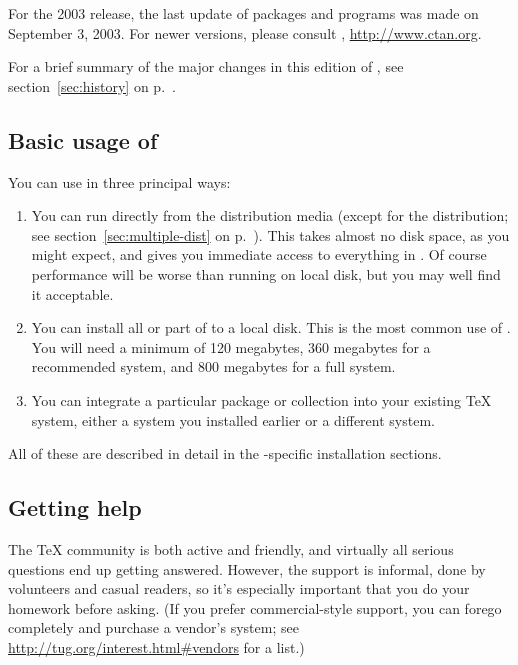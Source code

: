 \documentclass{article}
\begin{document}
For the 2003 release, the last update of packages and programs was made
on September 3, 2003.  For newer versions, please consult ,
\url{http://www.ctan.org}.

For a brief summary of the major changes in this edition of \TeXLive{},
see section~\ref{sec:history} on p.~\pageref{sec:history}.


\subsection{Basic usage of \protect\TeXLive{}}
\label{sec:basic}

You can use \TeXLive{} in three principal ways:

\begin{enumerate}

\item You can run \TeXLive{} directly from the distribution media
(except for the  distribution; see
section~\ref{sec:multiple-dist} on p.~\pageref{sec:multiple-dist}).
This takes almost no disk space, as you might expect, and gives you
immediate access to everything in \TeXLive{}.  Of course performance
will be worse than running on local disk, but you may well find it
acceptable.

\item You can install all or part of \TeXLive{} to a local disk.  This
is the most common use of \TeXLive.  You will need a minimum of 120
megabytes, 360 megabytes for a recommended system, and 800 megabytes for
a full system.

\item You can integrate a particular package or collection into your
existing \TeX{} system, either a \TeXLive{} system you installed earlier
or a different system.

\end{enumerate}

\noindent All of these are described in detail in the -specific
installation sections.


\subsection{Getting help}
\label{sec:help}

The \TeX{} community is both active and friendly, and virtually all
serious questions end up getting answered.  However, the support is
informal, done by volunteers and casual readers, so it's especially
important that you do your homework before asking.  (If you prefer
commercial-style support, you can forego \TeXLive{} completely and
purchase a vendor's system; see
\url{http://tug.org/interest.html#vendors} for a list.)
\end{document}

